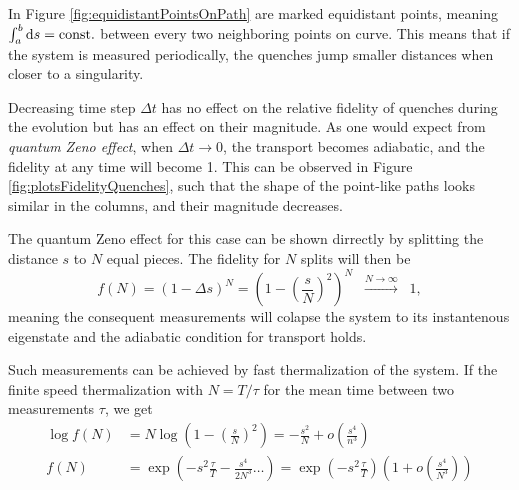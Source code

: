 In Figure \ref{fig:equidistantPointsOnPath} are marked equidistant points, meaning $\int_a^b \mathrm{d} s=\text{const.}$ between every two neighboring points on curve. This means that if the system is measured periodically, the quenches jump smaller distances when closer to a singularity.

Decreasing time step $\Delta t$ has no effect on the relative fidelity of quenches during the evolution but has an effect on their magnitude. As one would expect from \emph{quantum Zeno effect}, when $\Delta t\rightarrow 0$, the transport becomes adiabatic, and the fidelity at any time will become 1. This can be observed in Figure \ref{fig:plotsFidelityQuenches}, such that the shape of the point-like paths looks similar in the columns, and their magnitude decreases.

The quantum Zeno effect for this case can be shown dirrectly by splitting the distance $s$ to $N$ equal pieces. The fidelity for $N$ splits will then be
\begin{equation}
    f(N)=(1-\Delta s)^N=\left(1-\left(\frac{s}{N}\right)^2\right)^N \;\;\overset{N\rightarrow\infty}{\longrightarrow}\;\; 1,
\end{equation}
meaning the consequent measurements will colapse the system to its instantenous eigenstate and the adiabatic condition for transport holds. 

Such measurements can be achieved by fast thermalization of the system. If the finite speed thermalization with $N=T/\tau$ for the mean time between two measurements $\tau$, we get
\begin{equation}
    \begin{split}
        \log f(N) &= N \log \left(1-\left(\frac{s}{N}\right)^2\right) = -\frac{s^2}{N}+o\left(\frac{s^4}{n^3}\right)\\
        f(N) &= \exp\left(-s^2\frac{\tau}{T}-\frac{s^4}{2 N^3}\dots\right) = \exp\left(-s^2\frac{\tau}{T}\right)\left(1+o\left(\frac{s^4}{N^3}\right)\right)
    \end{split}
\end{equation}


